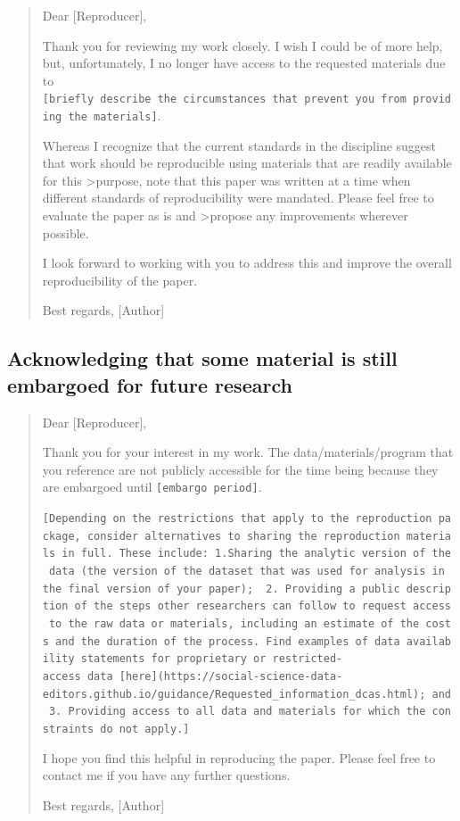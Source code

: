 \documentclass[]{book}
\begin{document}
\begin{quote}
Dear {[}Reproducer{]},

Thank you for reviewing my work closely. I wish I could be of more help, but, unfortunately, I no longer have access to the requested materials due to \texttt{{[}briefly\ describe\ the\ circumstances\ that\ prevent\ you\ from\ providing\ the\ materials{]}}.

Whereas I recognize that the current standards in the discipline suggest that work should be reproducible using materials that are readily available for this \textgreater{}purpose, note that this paper was written at a time when different standards of reproducibility were mandated. Please feel free to evaluate the paper as is and \textgreater{}propose any improvements wherever possible.

I look forward to working with you to address this and improve the overall reproducibility of the paper.

Best regards,
{[}Author{]}
\end{quote}

\hypertarget{acknowledging-that-some-material-is-still-embargoed-for-future-research}{%
\subsection{Acknowledging that some material is still embargoed for future research}\label{acknowledging-that-some-material-is-still-embargoed-for-future-research}}

\begin{quote}
Dear {[}Reproducer{]},

Thank you for your interest in my work. The data/materials/program that you reference are not publicly accessible for the time being because they are embargoed until \texttt{{[}embargo\ period{]}}.

\texttt{{[}Depending\ on\ the\ restrictions\ that\ apply\ to\ the\ reproduction\ package,\ consider\ alternatives\ to\ sharing\ the\ reproduction\ materials\ in\ full.\ These\ include:\ 1.Sharing\ the\ analytic\ version\ of\ the\ data\ (the\ version\ of\ the\ dataset\ that\ was\ used\ for\ analysis\ in\ the\ final\ version\ of\ your\ paper);\ \ 2.\ Providing\ a\ public\ description\ of\ the\ steps\ other\ researchers\ can\ follow\ to\ request\ access\ to\ the\ raw\ data\ or\ materials,\ including\ an\ estimate\ of\ the\ costs\ and\ the\ duration\ of\ the\ process.\ Find\ examples\ of\ data\ availability\ statements\ for\ proprietary\ or\ restricted-access\ data\ {[}here{]}(https://social-science-data-editors.github.io/guidance/Requested\_information\_dcas.html);\ and\ 3.\ Providing\ access\ to\ all\ data\ and\ materials\ for\ which\ the\ constraints\ do\ not\ apply.{]}}

I hope you find this helpful in reproducing the paper. Please feel free to contact me if you have any further questions.

Best regards,
{[}Author{]}
\end{quote}
\end{document}
